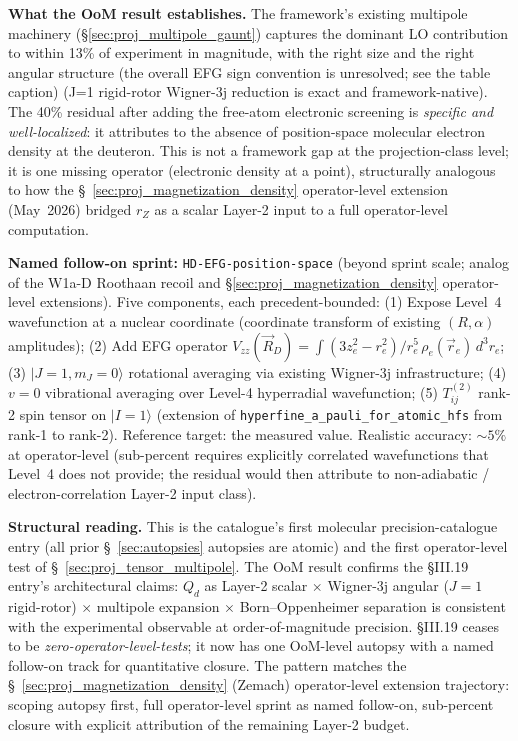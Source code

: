 \documentclass[11pt]{article}
\begin{document}
\textbf{What the OoM result establishes.}  The framework's existing
multipole machinery (\S\ref{sec:proj_multipole_gaunt}) captures
the dominant LO contribution to within 13\% of experiment in
magnitude, with the right size and the right angular structure (the
overall EFG sign convention is unresolved; see the table caption) (J=1 rigid-rotor Wigner-3j reduction is exact and
framework-native).  The 40\% residual after adding the free-atom
electronic screening is \emph{specific and well-localized}: it
attributes to the absence of position-space molecular electron
density at the deuteron.  This is not a framework gap at the
projection-class level; it is one missing operator (electronic
density at a point), structurally analogous to how the
\S~\ref{sec:proj_magnetization_density} operator-level extension
(May~2026) bridged $r_Z$ as a scalar Layer-2 input to a full
operator-level computation.

\textbf{Named follow-on sprint:} \texttt{HD-EFG-position-space}
(beyond sprint scale; analog of the W1a-D Roothaan recoil and
\S\ref{sec:proj_magnetization_density} operator-level extensions).
Five components, each precedent-bounded:
(1) Expose Level~4 wavefunction at a nuclear coordinate
(coordinate transform of existing $(R, \alpha)$ amplitudes);
(2) Add EFG operator $V_{zz}(\vec{R}_D) = \int (3 z_e^2 - r_e^2)/r_e^5
\, \rho_e(\vec{r}_e)\,d^3 r_e$;
(3) $|J=1, m_J=0\rangle$ rotational averaging via existing Wigner-3j
infrastructure;
(4) $v=0$ vibrational averaging over Level-4 hyperradial wavefunction;
(5) $T^{(2)}_{ij}$ rank-2 spin tensor on $|I=1\rangle$ (extension of
\texttt{hyperfine\_a\_pauli\_for\_atomic\_hfs} from rank-1 to rank-2).
Reference target: the measured value.
Realistic accuracy: $\sim 5\%$ at operator-level (sub-percent requires
explicitly correlated wavefunctions that Level~4 does not provide; the
residual would then attribute to non-adiabatic / electron-correlation
Layer-2 input class).

\textbf{Structural reading.}  This is the catalogue's first
molecular precision-catalogue entry (all prior \S~\ref{sec:autopsies}
autopsies are atomic) and the first operator-level test of
\S~\ref{sec:proj_tensor_multipole}.  The OoM result confirms the
\S III.19 entry's architectural claims: $Q_d$ as Layer-2 scalar
$\times$ Wigner-3j angular ($J=1$ rigid-rotor) $\times$ multipole
expansion $\times$ Born--Oppenheimer separation is consistent with
the experimental observable at order-of-magnitude precision.
\S III.19 ceases to be \emph{zero-operator-level-tests}; it now
has one OoM-level autopsy with a named follow-on track for
quantitative closure.  The pattern matches the
\S~\ref{sec:proj_magnetization_density} (Zemach) operator-level
extension trajectory: scoping autopsy first, full operator-level
sprint as named follow-on, sub-percent closure with explicit
attribution of the remaining Layer-2 budget.
\end{document}
